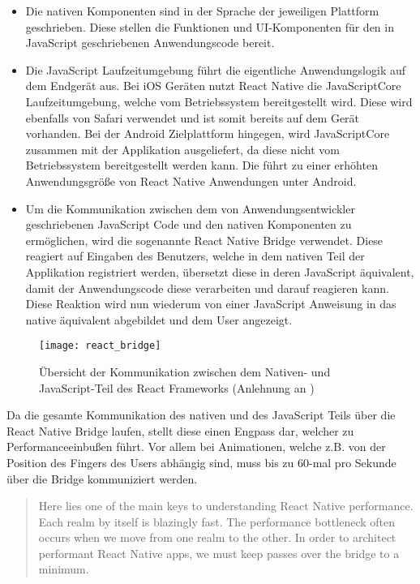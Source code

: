 \begin{itemize}
	\vspace{-2mm}
	\setlength\itemsep{0mm}
	\item Die nativen Komponenten sind in der Sprache der jeweiligen Plattform geschrieben. Diese stellen die Funktionen und UI-Komponenten für den in JavaScript geschriebenen Anwendungscode bereit.
	\item Die JavaScript Laufzeitumgebung führt die eigentliche Anwendungslogik auf dem Endgerät aus. Bei iOS Geräten nutzt React Native die JavaScriptCore Laufzeitumgebung, welche vom Betriebssystem bereitgestellt wird. Diese wird ebenfalls von Safari verwendet und ist somit bereits auf dem Gerät vorhanden. Bei der Android Zielplattform hingegen, wird JavaScriptCore zusammen mit der Applikation ausgeliefert, da diese nicht vom Betriebssystem bereitgestellt werden kann. Die führt zu einer erhöhten Anwendungsgröße von React Native Anwendungen unter Android.
	\item Um die Kommunikation zwischen dem von Anwendungsentwickler geschriebenen JavaScript Code und den nativen Komponenten zu ermöglichen, wird die sogenannte React Native Bridge verwendet. Diese reagiert auf Eingaben des Benutzers, welche in dem nativen Teil der Applikation registriert werden, übersetzt diese in deren JavaScript äquivalent, damit der Anwendungscode diese verarbeiten und darauf reagieren kann. Diese Reaktion wird nun wiederum von einer JavaScript Anweisung in das native äquivalent abgebildet und dem User angezeigt.
\end{itemize}

\newpage

\begin{figure}[h]
	\texttt{[image: react\_bridge]}
	\centering
	\caption[Übersicht der Kommunikation des React Frameworks]{Übersicht der Kommunikation zwischen dem Nativen- und JavaScript-Teil des React Frameworks (Anlehnung an \cite{droids_react_intro})}
\end{figure}

Da die gesamte Kommunikation des nativen und des JavaScript Teils über die React Native Bridge laufen, stellt diese einen Engpass dar, welcher zu Performanceeinbußen führt. Vor allem bei Animationen, welche z.B. von der Position des Fingers des Users abhängig sind, muss bis zu 60-mal pro Sekunde über die Bridge kommuniziert werden.

\blockcquote{talKol_react_performance}{
Here lies one of the main keys to understanding React Native performance. Each realm by itself is blazingly fast. The performance bottleneck often occurs when we move from one realm to the other. In order to architect performant React Native apps, we must keep passes over the bridge to a minimum.
}

